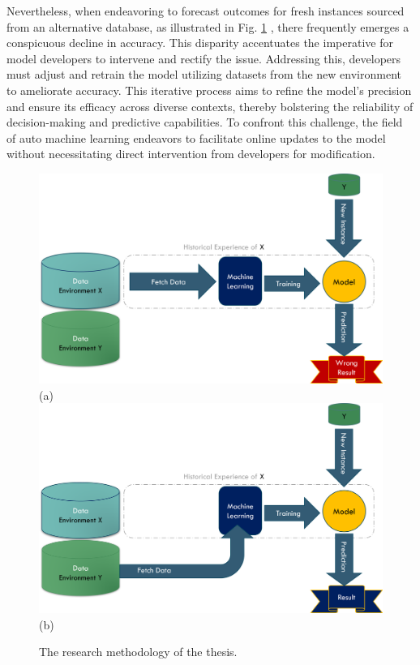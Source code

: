Nevertheless, when endeavoring to forecast outcomes for fresh instances sourced from an alternative database, as illustrated in Fig. \ref{fig:machine-new-senario}
, there frequently emerges a conspicuous decline in accuracy. This disparity accentuates the imperative for model developers to intervene and rectify the issue. Addressing this, developers must adjust and retrain the model utilizing datasets from the new environment to ameliorate accuracy. This iterative process aims to refine the model's precision and ensure its efficacy across diverse contexts, thereby bolstering the reliability of decision-making and predictive capabilities. To confront this challenge, the field of auto machine learning endeavors to facilitate online updates to the model without necessitating direct intervention from developers for modification.

\begin{figure}[!ht]
    \centering
    \includegraphics[width=.8\textwidth]{1_introduction/figures/PNG/wrong_machine_flow_1.png}\\
    (a) \\
    \includegraphics[width=.8\textwidth]{1_introduction/figures/PNG/wrong_machine_flow_2.png}\\
    (b)
    \caption{The research methodology of the thesis.}
    \label{fig:machine-new-senario}
\end{figure}



